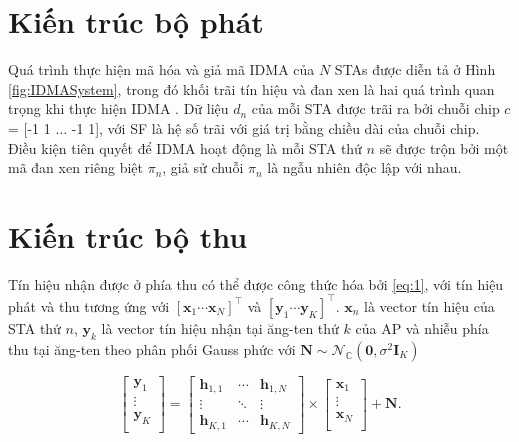 \section{Kiến trúc bộ phát}\label{IIA}

Quá trình thực hiện mã hóa và giả mã IDMA của $N$ STAs được diễn tả ở Hình \ref{fig:IDMASystem}, trong đó khối trãi tín hiệu và đan xen là hai quá trình quan trọng khi thực hiện IDMA \cite{IDMA_LiPing}. Dữ liệu $d_n$ của mỗi STA được trãi ra bởi chuỗi chip $c$ = [-1 1 $\dots$ -1 1], với \acrshort{SF} là hệ số trãi với giá trị bằng chiều dài của chuỗi chip. Điều kiện tiên quyết để IDMA hoạt động là mỗi STA thứ $n$ sẽ được trộn bởi một mã đan xen riêng biệt $\pi_n$, giả sử chuỗi $\pi_n$ là ngẫu nhiên độc lập với nhau.

\section{Kiến trúc bộ thu}\label{IIB}

Tín hiệu nhận được ở phía thu có thể được công thức hóa bởi \eqref{eq:1}, với tín hiệu phát và thu tương ứng với $[\mathbf{x}_1 \cdots \mathbf{x}_N]^\top$ và $[\mathbf{y}_1 \cdots \mathbf{y}_K]^\top$. $\mathbf{x}_n$ là vector tín hiệu của STA thứ $n$, $\mathbf{y}_k$ là vector tín hiệu nhận tại ăng-ten thứ $k$ của AP và nhiễu phía thu tại ăng-ten theo phân phối Gauss phức với $\mathbf{N} \sim \mathcal{N}_\mathbb{C}(\mathbf{0},\sigma^2\mathbf{I}_K)$

\begin{equation}
    \begin{bmatrix}
        \mathbf{y}_1 \\
        \vdots       \\
        \mathbf{y}_K \\ 
    \end{bmatrix}
    =
    \begin{bmatrix}
        \mathbf{h}_{1,1}  & \cdots & \mathbf{h}_{1,N} \\
        \vdots            & \ddots & \vdots           \\
        \mathbf{h}_{K,1}  & \cdots & \mathbf{h}_{K,N} 
    \end{bmatrix}
    \times
    \begin{bmatrix}
        \mathbf{x}_1 \\
        \vdots       \\
        \mathbf{x}_N \\ 
    \end{bmatrix}
    +
    \mathbf{N}.
    \label{eq:1}
\end{equation}


